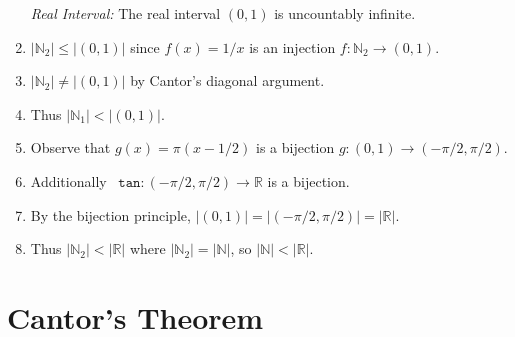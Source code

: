 \documentclass[a4paper, 11pt]{article} %
\newcommand{\set}[1]{\lbrace#1\rbrace} %
\newcommand{\abs}[1]{|#1|} %
\newcommand{\N}{\mathbb{N}}
\newcommand{\R}{\mathbb{R}}
\begin{document}
\begin{enumerate}
  \item[\it Real Interval:] The real interval $(0,1)$ is uncountably infinite.
    \item $\abs{\N_2} \leq \abs{(0,1)}$ since $f(x) = 1/x$ is an injection $f: \N_2 \to (0,1)$.
    \item $\abs{\N_2} \neq \abs{(0,1)}$ by Cantor's diagonal argument.
    \item Thus $\abs{\N_1} < \abs{(0,1)}$.
    \item Observe that $g(x) = \pi(x - 1/2)$ is a bijection $g: (0,1) \to (-\pi/2,\pi/2)$. 
    \item Additionally~ $\texttt{tan}: (-\pi/2,\pi/2) \to \R$ is a bijection. 
    \item By the bijection principle, $\abs{(0,1)} = \abs{(-\pi/2,\pi/2)} = \abs{\R}$.
    \item Thus $\abs{\N_2} < \abs{\R}$ where $\abs{\N_2} = \abs{\N}$, so $\abs{\N} < \abs{\R}$.
\end{enumerate}



\section*{Cantor's Theorem}
\end{document}
